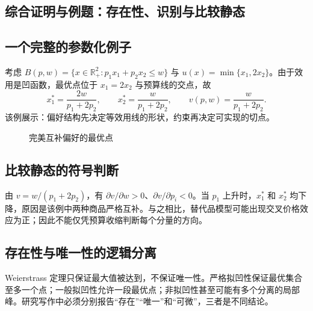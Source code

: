 \subsection{综合证明与例题：存在性、识别与比较静态}

\subsection{一个完整的参数化例子}
考虑 $B(p,w)=\{x\in\mathbb R_+^2:p_1x_1+p_2x_2\le w\}$ 与
$u(x)=\min\{x_1,2x_2\}$。由于效用是凹函数，最优点位于 $x_1=2x_2$ 与预算线的交点，故
\[
x_1^*=\frac{2w}{p_1+2p_2},\qquad x_2^*=\frac{w}{p_1+2p_2},\qquad
v(p,w)=\frac{w}{p_1+2p_2}.
\]
该例展示：偏好结构先决定等效用线的形状，约束再决定可实现的切点。

\begin{figure}[H]\centering
{}
\caption{完美互补偏好的最优点}
\end{figure}

\subsection{比较静态的符号判断}
由 $v=w/(p_1+2p_2)$，有 $\partial v/\partial w>0$、$\partial v/\partial p_i<0$。当 $p_1$ 上升时，$x_1^*$ 和 $x_2^*$ 均下降，原因是该例中两种商品严格互补。与之相比，替代品模型可能出现交叉价格效应为正；因此不能仅凭预算收缩判断每个分量的方向。

\subsection{存在性与唯一性的逻辑分离}
Weierstrass 定理只保证最大值被达到，不保证唯一性。严格拟凹性保证最优集合至多一个点；一般拟凹性允许一段最优点；非拟凹性甚至可能有多个分离的局部峰。研究写作中必须分别报告“存在”“唯一”和“可微”，三者是不同结论。

